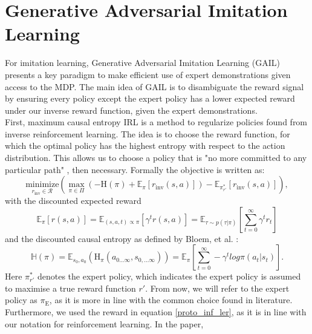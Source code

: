 \chapter{Generative Adversarial Imitation Learning}
\label{app:GAIL}
For imitation learning, Generative Adversarial Imitation Learning (GAIL) 
\cite{ho2016generative} presents a key paradigm to make efficient use of expert demonstrations given access to the MDP. 
The main idea of GAIL is to disambiguate the reward signal 
by ensuring every policy except the expert policy has a lower expected reward under our inverse reward function, given the expert 
demonstrations.\\ 
First, 
maximum causal entropy IRL \cite{10.5555/3104322.3104481} is a method to regularize policies found from inverse reinforcement learning. The idea is to choose the reward function, for 
which the optimal policy has the highest entropy with respect to the action distribution. This allows us to choose a policy that is "no more committed to any 
particular path" \cite[p.2]{10.5555/3104322.3104481}, then necessary. Formally the objective is written as:
\begin{equation*}
    \label{proto_inf_ler}
    \underset{r_{\text{inv}} \in \mathcal{R}}{\text{minimize}} \left( \max_{\pi \in \Pi} \left( - \text{H}(\pi) + \mathbb{E}_{\pi}[r_{\text{inv}}(s, a)] \right) - \mathbb{E}_{\pi_{r'}^*}[r_{\text{inv}}(s,a)] \right),
\end{equation*}
with the discounted expected reward
\begin{equation*}
    \mathbb{E}_{\pi}[r(s, a)] =
    \mathbb{E}_{(s,a,t) \propto \pi}[\gamma^t r(s,a)] = 
    \mathbb{E}_{\tau \sim p(\tau | \pi)} \left[ \sum_{t=0}^\infty \gamma^t r_t \right]
\end{equation*}
and the discounted causal entropy as defined by Bloem, et al. \cite{InfCausalEnt}:
\begin{equation*}
    \mathbb{H}(\pi) = \mathbb{E}_{s_0, a_0} \left(\text{H}_{\pi}(a_{0...\infty}, s_{0,...\infty})\right) = \mathbb{E}_{\pi}\left[\sum_{t=0}^\infty -\gamma^t log \pi(a_t|s_t)\right].
\end{equation*}
Here $\pi_{r'}^*$ denotes the expert policy, which indicates the expert policy is assumed to maximise a true 
reward function ${r'}$. From now, we will refer to the expert policy as $\pi_{\text{E}}$, as it is more in line with the common choice found in 
literature. Furthermore, we used the reward in equation  \ref{proto_inf_ler}, as it is in line with our notation for reinforcement learning. In the paper, 
